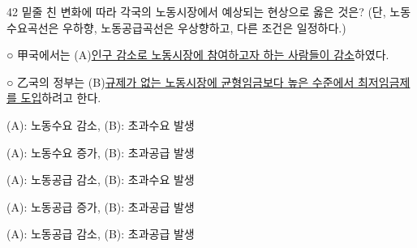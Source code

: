 \begin{question}{42}
밑줄 친 변화에 따라 각국의 노동시장에서 예상되는 현상으로 옳은 것은? (단, 노동수요곡선은 우하향, 노동공급곡선은 우상향하고, 다른 조건은 일정하다.)
\begin{framedtext}
○ 甲국에서는 (A)\uline{인구 감소로 노동시장에 참여하고자 하는 사람들이 감소}하였다. \par
○ 乙국의 정부는 (B)\uline{규제가 없는 노동시장에 균형임금보다 높은 수준에서 최저임금제를 도입}하려고 한다. \par
\end{framedtext}
\begin{choices}
  \item (A): 노동수요 감소, (B): 초과수요 발생
  \item (A): 노동수요 증가, (B): 초과공급 발생
  \item (A): 노동공급 감소, (B): 초과수요 발생
  \item (A): 노동공급 증가, (B): 초과공급 발생
  \item (A): 노동공급 감소, (B): 초과공급 발생
\end{choices}
\end{question}
